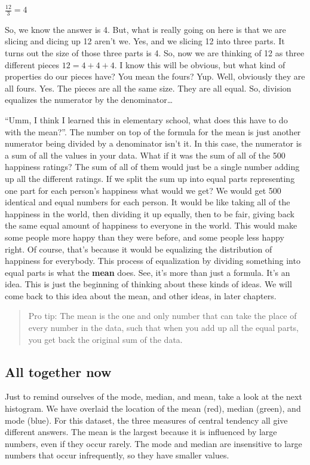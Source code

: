 \documentclass[
]{book}
\begin{document}
\(\frac{12}{3} = 4\)

So, we know the answer is 4. But, what is really going on here is that we are slicing and dicing up 12 aren't we. Yes, and we slicing 12 into three parts. It turns out the size of those three parts is 4. So, now we are thinking of 12 as three different pieces \(12 = 4 + 4 + 4\). I know this will be obvious, but what kind of properties do our pieces have? You mean the fours? Yup. Well, obviously they are all fours. Yes. The pieces are all the same size. They are all equal. So, division equalizes the numerator by the denominator\ldots{}

``Umm, I think I learned this in elementary school, what does this have to do with the mean?''. The number on top of the formula for the mean is just another numerator being divided by a denominator isn't it. In this case, the numerator is a sum of all the values in your data. What if it was the sum of all of the 500 happiness ratings? The sum of all of them would just be a single number adding up all the different ratings. If we split the sum up into equal parts representing one part for each person's happiness what would we get? We would get 500 identical and equal numbers for each person. It would be like taking all of the happiness in the world, then dividing it up equally, then to be fair, giving back the same equal amount of happiness to everyone in the world. This would make some people more happy than they were before, and some people less happy right. Of course, that's because it would be equalizing the distribution of happiness for everybody. This process of equalization by dividing something into equal parts is what the \textbf{mean} does. See, it's more than just a formula. It's an idea. This is just the beginning of thinking about these kinds of ideas. We will come back to this idea about the mean, and other ideas, in later chapters.

\begin{quote}
Pro tip: The mean is the one and only number that can take the place of every number in the data, such that when you add up all the equal parts, you get back the original sum of the data.
\end{quote}

\subsection{All together now}\label{all-together-now}

Just to remind ourselves of the mode, median, and mean, take a look at the next histogram. We have overlaid the location of the mean (red), median (green), and mode (blue). For this dataset, the three measures of central tendency all give different answers. The mean is the largest because it is influenced by large numbers, even if they occur rarely. The mode and median are insensitive to large numbers that occur infrequently, so they have smaller values.
\end{document}

